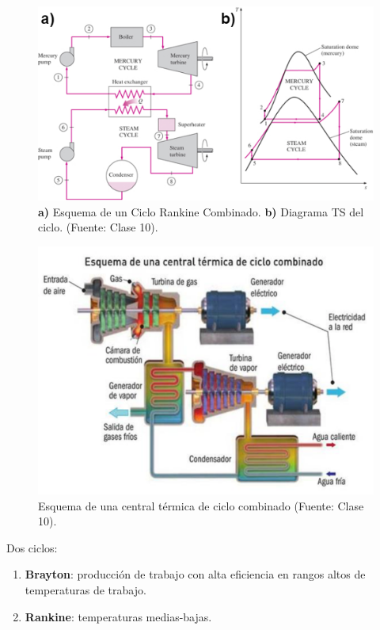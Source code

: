             \begin{figure}
                \includegraphics[width=.75\textwidth]{img/clases/ciclo_rankine_combinado.png}
                \caption[Ciclo Rankine Combinado]{\textbf{a)} Esquema de un Ciclo Rankine Combinado. \textbf{b)} Diagrama TS del ciclo. (Fuente: Clase 10).}
                \label{fig:ciclo_rankine_comb}
            \end{figure}
            
            
            \begin{figure}
                \includegraphics[width=.65\textwidth]{img/clases/central_termoelectrica_esquema.png}
                \caption{Esquema de una central térmica de ciclo combinado (Fuente: Clase 10).}
                \label{fig:esquema_ciclo_combinado}
            \end{figure}
            
            Dos ciclos:
            
            \begin{enumerate}
                \item \textbf{Brayton}: producción de trabajo con alta eficiencia en rangos altos de temperaturas de trabajo.
                \item \textbf{Rankine}: temperaturas medias-bajas.
            \end{enumerate}
            
